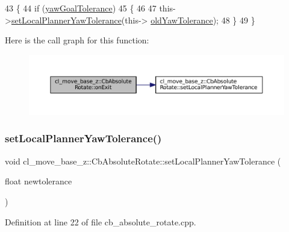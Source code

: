 \begin{DoxyCode}
43 \{
44     \textcolor{keywordflow}{if} (\hyperlink{classcl__move__base__z_1_1CbAbsoluteRotate_a8d8b5b9c2c821efe101bb07c96c4bdd3}{yawGoalTolerance})
45     \{
46 
47         this->\hyperlink{classcl__move__base__z_1_1CbAbsoluteRotate_aba8d93d615ccd43acd0684f8e88e2209}{setLocalPlannerYawTolerance}(this->
      \hyperlink{classcl__move__base__z_1_1CbAbsoluteRotate_a2cfcd2978e7923494e2e66107e134e27}{oldYawTolerance});
48     \}
49 \}
\end{DoxyCode}
Here is the call graph for this function\+:
\nopagebreak
\begin{figure}[H]
\begin{center}
\leavevmode
\includegraphics[width=350pt]{classcl__move__base__z_1_1CbAbsoluteRotate_a0e362b8e9f0d7de5aeee183ba4031437_cgraph}
\end{center}
\end{figure}
\mbox{\label{classcl__move__base__z_1_1CbAbsoluteRotate_aba8d93d615ccd43acd0684f8e88e2209}} 
\subsubsection{\texorpdfstring{set\+Local\+Planner\+Yaw\+Tolerance()}{setLocalPlannerYawTolerance()}}
{\footnotesize\ttfamily void cl\+\_\+move\+\_\+base\+\_\+z\+::\+Cb\+Absolute\+Rotate\+::set\+Local\+Planner\+Yaw\+Tolerance (\begin{DoxyParamCaption}\item[{float}]{newtolerance }\end{DoxyParamCaption})\hspace{0.3cm}{\ttfamily [private]}}



Definition at line 22 of file cb\+\_\+absolute\+\_\+rotate.\+cpp.



